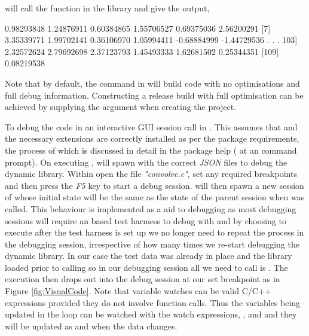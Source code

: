 will call the  function in the library and give the output,

\begin{Schunk}
  \begin{Sinput}
  [1]  0.98293848  1.24876911  0.60384865  1.55706527  0.69375036  2.56200291
  [7]  3.35339771  1.99702141  0.36106970  1.05994411 -0.68884999 -1.44729536
   .
   .
   .
 103]  2.32572624  2.79692698  2.37123793  1.45493333  1.62681502  0.25344351
[109]  0.08219538
  \end{Sinput}
\end{Schunk}

Note that by default, the  command in  will build code with no optimisations and full debug information. 
Constructing a release build with full optimisation can be achieved by supplying the  argument when creating the project. 

To debug the code in an interactive GUI session call  in . This assumes that
 and the necessary extensions are correctly installed as per the package requirements, the process of which is discussed in 
detail in the package help ( at an  command prompt). On executing ,  will spawn  
with the correct \emph{JSON} files to debug the dynamic library. Within  open the file \emph{"convolve.c"}, set any required
breakpoints and then press the \emph{F5} key to start a debug session.  will then spawn a new session of  whose initial state
will be the same as the state of the parent  session when  was called. This behaviour is implemented as a aid to debugging as most 
debugging sessions will require an  based test harmess to debug with and by choosing to execute  after the  test harness is 
set up we no longer need to repeat the process in the debugging session, irrespective of how many times we re-start debugging the dynamic library. In our case 
the test data was already in place and the library loaded prior to calling  so in our debugging session all we need to call is . 
The execution then drops out into the debug session at our set breakpoint as in Figure \ref{fig:VisualCode}. Note that variable watches can be valid C/C++
expressions provided they do not involve function calls. Thus the variables being updated in the loop can be watched with the watch expressions, , 
 and  and they will be updated as and when the data changes. 

